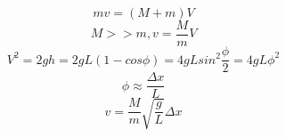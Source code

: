 \documentclass[a4paper, 12pt]{article}
\begin{document}
\begin{equation*}
    mv=(M+m)V
\end{equation*}
\begin{equation*}
    M >> m, v=\frac{M}{m}V
\end{equation*}
\begin{equation*}
    V^2=2gh=2gL(1-cos\phi)=4gLsin^2\frac{\phi}{2}=4gL\phi^2
\end{equation*}
\begin{equation*}
    \phi \approx \frac{\Delta x}{L}
\end{equation*}
\begin{equation*}
    v=\frac{M}{m}\sqrt{\frac{g}{L}}\Delta x
\end{equation*}
\end{document}
